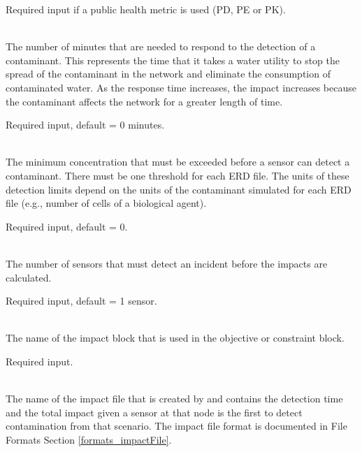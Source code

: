 \begin{description}[topsep=0pt,parsep=0.5em,itemsep=-0.4em]
\begin{description}[topsep=0pt,parsep=0.5em,itemsep=-0.4em]
                Required input if a public health metric is used (PD, PE or PK).
    \item[{response time}]\hfill
\\The number of minutes that are needed to respond to the
                detection of a contaminant. This represents the time that it takes
                a water utility to stop the spread of the contaminant in the network and 
                eliminate the consumption of contaminated water. As the response time increases,
                the impact increases because the contaminant affects the network
                for a greater length of time.  
                
                Required input, default = 0 minutes.
    \item[{detection limit}]\hfill
\\The minimum concentration that must be exceeded before a sensor can detect a contaminant.
                There must be one threshold for each ERD file. The units of
                these detection limits depend on the units of the contaminant
                simulated for each ERD file (e.g., number of cells of a
                biological agent).  
                
                Required input, default = 0.
    \item[{detection confidence}]\hfill
\\The number of sensors that must detect an incident before
                the impacts are calculated.  
                
                Required input, default = 1 sensor.
  \end{description}
  \item[{impact data}]\hfill
  \begin{description}[topsep=0pt,parsep=0.5em,itemsep=-0.4em]
    \item[{name}]\hfill
\\The name of the impact block that is used in the objective or constraint block.
                
                Required input.
    \item[{impact file}]\hfill
\\The name of the impact file that is created by  and 
                contains the detection time and the total
                impact given a sensor at that node is the first to detect
                contamination from that scenario. 
                The impact file format is documented in File Formats Section \ref{formats_impactFile}.
                

\end{description}
\end{description}
